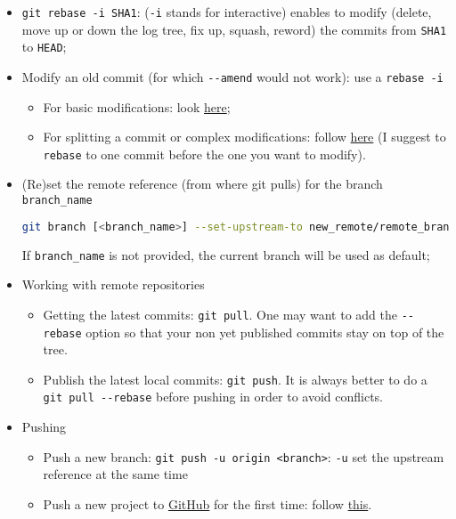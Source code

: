 \documentclass[a4paper,12pt,%
              final%
              ]{article}
\begin{document}
\begin{itemize}
\begin{itemize}
    \end{itemize}
  \item \verb|git rebase -i SHA1|: (\texttt{-i} stands for interactive) enables to modify (delete, move up or down the log tree, fix up, squash, reword) the commits from \texttt{SHA1} to \texttt{HEAD};
  \item Modify an old commit (for which \verb|--amend| would not work): use a \texttt{rebase -i}
    \begin{itemize}
      \item For basic modifications: look \href{https://stackoverflow.com/questions/1186535/how-to-modify-a-specified-commit}{here};
      \item For splitting a commit or complex modifications: follow \href{https://stackoverflow.com/questions/6217156/break-a-previous-commit-into-multiple-commits}{here} (I suggest to \texttt{rebase} to one commit before the one you want to modify).
    \end{itemize}
  \item (Re)set the remote reference (from where git pulls) for the branch \verb|branch_name|
\begin{lstlisting}[language=bash]
git branch [<branch_name>] --set-upstream-to new_remote/remote_branch
\end{lstlisting}
    If \verb|branch_name| is not provided, the current branch will be used as default;
  \item Working with remote repositories
    \begin{itemize}
      \item Getting the latest commits: \verb|git pull|. One may want to add the \verb|--rebase| option so that your non yet published commits stay on top of the tree.
      \item Publish the latest local commits: \verb|git push|. It is always better to do a \verb|git pull --rebase| before pushing in order to avoid conflicts.
    \end{itemize}
  \item Pushing
    \begin{itemize}
      \item Push a new branch: \verb|git push -u origin <branch>|: \verb|-u| set the upstream reference at the same time
      \item Push a new project to \href{https://github.com/}{GitHub} for the first time: follow \href{https://help.github.com/en/github/importing-your-projects-to-github/adding-an-existing-project-to-github-using-the-command-line}{this}.

\end{itemize}
\end{itemize}
\end{document}
